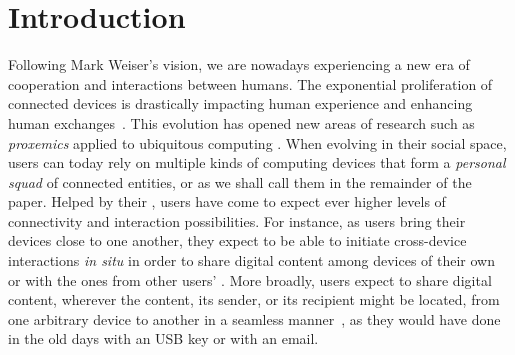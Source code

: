 \section{Introduction}

Following Mark Weiser's vision, we are nowadays
experiencing a new era of cooperation and interactions between humans.
The exponential proliferation of connected devices is
drastically impacting human experience and enhancing human
exchanges~\cite{Dearman:2008, Oh:2017, Sohn:2008,Harper08}. This evolution has opened new areas of research such as
\textit{proxemics} applied to ubiquitous computing
\cite{Marquardt:2011}. When evolving in their social space, users can today rely on
multiple kinds of computing devices that form a \textit{personal squad} of connected entities, or \squad as we shall call them in the remainder of the
paper. Helped by their \squad, users
have come to expect ever higher levels of connectivity and interaction
possibilities. For instance, as users bring
their devices close to one another, they expect to be able to initiate cross-device
interactions \textit{in situ} in order to share digital content
\cite{Oh:2017} among devices of their own \squad or with the ones 
from other users' \squad. More broadly, users expect to share digital content,
wherever the content, its sender, or its recipient might be located, from one
arbitrary device to another in a seamless manner~\cite{Dearman:2008}, as they
would have done in the old days with an USB key or with an email. 

